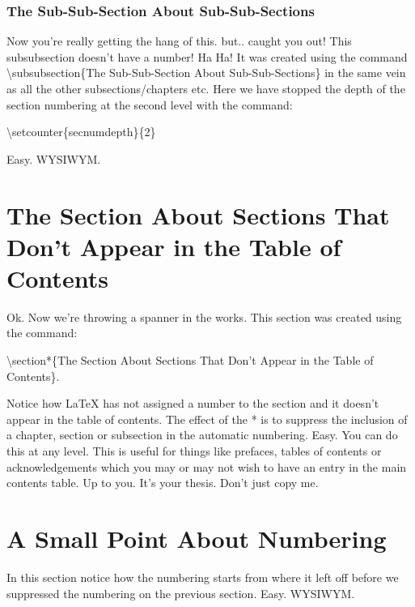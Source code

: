 \subsubsection{The Sub-Sub-Section About Sub-Sub-Sections}
\label{sec:SubSubSection}
Now you're really getting the hang of this. but.. caught you out! This subsubsection doesn't have a number!  Ha Ha! It was created using the command {\textbackslash}subsubsection\{The Sub-Sub-Section About Sub-Sub-Sections\} in the same vein as all the other subsections/chapters etc. Here we have stopped the depth of the section numbering at the second level with the command:

\vspace*{2ex}

{\textbackslash}setcounter\{secnumdepth\}\{2\}

\vspace*{2ex}

Easy. WYSIWYM. 

\pagebreak
\section*{The Section About Sections That Don't Appear in the Table of Contents}
\label{sec:InvisibleSection}
Ok. Now we're throwing a spanner in the works. This section was created using the command:

\vspace*{2ex}

{\textbackslash}section*\{The Section About Sections That Don't Appear in the Table of Contents\}. 

\vspace*{2ex}

Notice how LaTeX has not assigned a number to the section and it doesn't appear in the table of contents. The effect of the * is to suppress the inclusion of a chapter, section or subsection in the automatic numbering. Easy. You can do this at any level. This is useful for things like prefaces, tables of contents or acknowledgements which you may or may not wish to have an entry in the main contents table. Up to you. It's your thesis. Don't just copy me.

\section{A Small Point About Numbering}

In this section notice how the numbering starts from where it left off before we suppressed the numbering on the previous section. Easy. WYSIWYM.
\pagebreak


